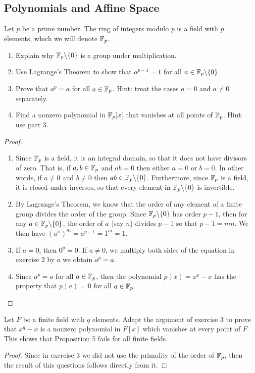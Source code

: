 \subsection{Polynomials and Affine Space}


\begin{exercise}{3}
Let $p$ be a prime number. The ring of integers modulo $p$ is a field with $p$ elements, which we will denote $\mathbb{F}_p$.
\begin{enumerate}
    \item Explain why $\mathbb{F}_p\backslash\{0\}$ is a group under multiplication.
    \item Use Lagrange's Theorem to show that $a^{p-1}=1$ for all $a\in \mathbb{F}_p\backslash\{0\}$.
    \item Prove that $a^p=a$ for all $a\in\mathbb{F}_p$. Hint: treat the cases $a=0$ and $a\neq 0$ separately.
    \item Find a nonzero polynomial in $\mathbb{F}_p[x]$ that vanishes at all points of $\mathbb{F}_p$. Hint: use part 3.
\end{enumerate}
\end{exercise}
\begin{proof}
 \begin{enumerate}
     \item Since $\mathbb{F}_p$ is a field, it is an integral domain, so that it does not have divisors of zero. That is, if $a,b\in\mathbb{F}_p$ and $ab=0$ then either $a=0$ or $b=0$. In other words, if $a\neq 0$ and $b\neq 0$ then $ab\in\mathbb{F}_p\backslash\{0\}$. Furthermore, since $\mathbb{F}_p$  is a field, it is closed under inverses, so that every element in $\mathbb{F}_p\backslash\{0\}$ is invertible.
     \item By Lagrange's Theorem, we know that the order of any element of a finite group divides the order of the group. Since $\mathbb{F}_p\backslash\{0\}$ has order $p-1$, then for any $a\in\mathbb{F}_p\backslash\{0\}$, the order of $a$ (say $n$) divides $p-1$ so that $p-1=mn$. We then have $(a^n)^m=a^{p-1}=1^m=1$.
     \item If $a=0$, then $0^p=0$. If $a\neq 0$, we multiply both sides of the equation in exercise 2 by $a$ we obtain $a^p=a$.
     \item Since $a^p=a$ for all $a\in\mathbb{F}_p$, then the polynomial $p(x)=x^p-x$ has the property that $p(a)=0$ for all $a\in\mathbb{F}_p$.
 \end{enumerate}
\end{proof}

\begin{exercise}{4}
Let $F$ be a finite field with $q$ elements. Adapt the argument of exercise 3 to prove that $x^q-x$ is a nonzero polynomial in $F[x]$ which vanishes at every point of $F$. This shows that Proposition 5 fails for all finite fields.
\end{exercise}
\begin{proof}
 Since in exercise 3 we did not use the primality of the order of $\mathbb{F}_p$, then the result of this questions follows directly from it.
\end{proof}
